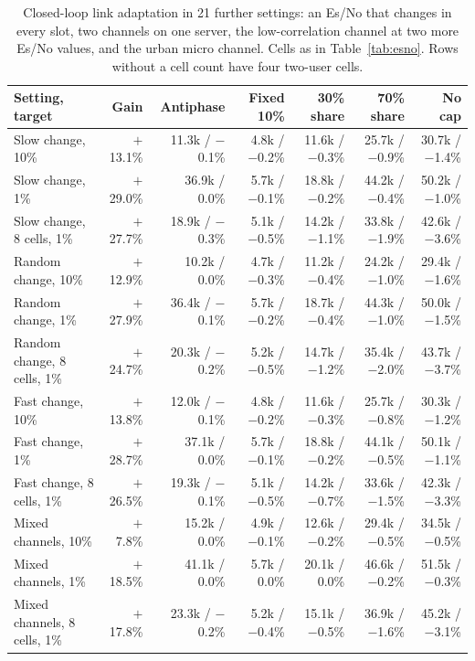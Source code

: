 \documentclass[acmsmall,screen,review,anonymous]{acmart}
\newcommand{\sys}{Antiphase\xspace}
\begin{document}
\begin{table}[t]
\caption{Closed-loop link adaptation in 21 further settings: an Es/No that changes in every slot, two channels
on one server, the low-correlation channel at two more Es/No values, and the urban micro channel. Cells as in
Table~\ref{tab:esno}. Rows without a cell count have four two-user cells.}
\label{tab:more}
\footnotesize
\setlength{\tabcolsep}{2.5pt}
\begin{tabular}{@{}lrrrrrr@{}}
\toprule
Setting, target & Gain & \sys & Fixed 10\% & 30\% share & 70\% share & No cap \\
\midrule
Slow change, 10\% & $+$13.1\% & 11.3k / $-$0.1\% & 4.8k / $-$0.2\% & 11.6k / $-$0.3\% & 25.7k / $-$0.9\% & 30.7k / $-$1.4\% \\
Slow change, 1\% & $+$29.0\% & 36.9k / 0.0\% & 5.7k / $-$0.1\% & 18.8k / $-$0.2\% & 44.2k / $-$0.4\% & 50.2k / $-$1.0\% \\
Slow change, 8 cells, 1\% & $+$27.7\% & 18.9k / $-$0.3\% & 5.1k / $-$0.5\% & 14.2k / $-$1.1\% & 33.8k / $-$1.9\% & 42.6k / $-$3.6\% \\
Random change, 10\% & $+$12.9\% & 10.2k / 0.0\% & 4.7k / $-$0.3\% & 11.2k / $-$0.4\% & 24.2k / $-$1.0\% & 29.4k / $-$1.6\% \\
Random change, 1\% & $+$27.9\% & 36.4k / $-$0.1\% & 5.7k / $-$0.2\% & 18.7k / $-$0.4\% & 44.3k / $-$1.0\% & 50.0k / $-$1.5\% \\
Random change, 8 cells, 1\% & $+$24.7\% & 20.3k / $-$0.2\% & 5.2k / $-$0.5\% & 14.7k / $-$1.2\% & 35.4k / $-$2.0\% & 43.7k / $-$3.7\% \\
Fast change, 10\% & $+$13.8\% & 12.0k / $-$0.1\% & 4.8k / $-$0.2\% & 11.6k / $-$0.3\% & 25.7k / $-$0.8\% & 30.3k / $-$1.2\% \\
Fast change, 1\% & $+$28.7\% & 37.1k / 0.0\% & 5.7k / $-$0.1\% & 18.8k / $-$0.2\% & 44.1k / $-$0.5\% & 50.1k / $-$1.1\% \\
Fast change, 8 cells, 1\% & $+$26.5\% & 19.3k / $-$0.1\% & 5.1k / $-$0.5\% & 14.2k / $-$0.7\% & 33.6k / $-$1.5\% & 42.3k / $-$3.3\% \\
Mixed channels, 10\% & $+$7.8\% & 15.2k / 0.0\% & 4.9k / $-$0.1\% & 12.6k / $-$0.2\% & 29.4k / $-$0.5\% & 34.5k / $-$0.5\% \\
Mixed channels, 1\% & $+$18.5\% & 41.1k / 0.0\% & 5.7k / 0.0\% & 20.1k / 0.0\% & 46.6k / $-$0.2\% & 51.5k / $-$0.3\% \\
Mixed channels, 8 cells, 1\% & $+$17.8\% & 23.3k / $-$0.2\% & 5.2k / $-$0.4\% & 15.1k / $-$0.5\% & 36.9k / $-$1.6\% & 45.2k / $-$3.1\% \\

\end{tabular}
\end{table}
\end{document}
